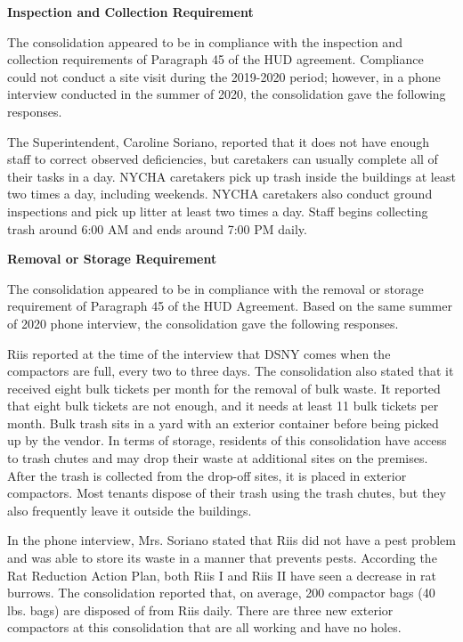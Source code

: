 

\textbf{Inspection and Collection Requirement}

The consolidation appeared to be in compliance with the inspection and collection requirements of Paragraph 45 of the HUD agreement. Compliance could not conduct a site visit during the 2019-2020 period; however, in a phone interview conducted in the summer of 2020, the consolidation gave the following responses. 

The Superintendent, Caroline Soriano, reported that it does not have enough staff to correct observed deficiencies, but caretakers can usually complete all of their tasks in a day. NYCHA caretakers pick up trash inside the buildings at least two times a day, including weekends. NYCHA caretakers also conduct ground inspections and pick up litter at least two times a day. Staff begins collecting trash around 6:00 AM and ends around 7:00 PM daily.

\textbf{Removal or Storage Requirement}

The consolidation appeared to be in compliance with the removal or storage requirement of Paragraph  45 of the HUD  Agreement.  Based on the same summer of 2020 phone interview, the consolidation gave the following responses.  

Riis reported at the time of the interview that DSNY comes when the compactors are full, every two to three days. The consolidation also stated that it received eight bulk tickets per month for the removal of bulk waste. It reported that eight bulk tickets are not enough, and it needs at least 11 bulk tickets per month.  Bulk trash sits in a yard with an exterior container before being picked up by the vendor. In terms of storage, residents of this consolidation have access to trash chutes and may drop their waste at additional sites on the premises. After the trash is collected from the drop-off sites, it is placed in exterior compactors. Most tenants dispose of their trash using the trash chutes, but they also frequently leave it outside the buildings.  

In the phone interview, Mrs. Soriano stated that Riis did not have a pest problem and was able to store its waste in a manner that prevents pests. According  the Rat Reduction  Action  Plan, both Riis I and Riis II  have seen a decrease in rat burrows. The consolidation reported that, on average, 200 compactor bags (40 lbs. bags) are disposed of from Riis daily. There are three new exterior compactors at this consolidation that are all working and have no holes. 

